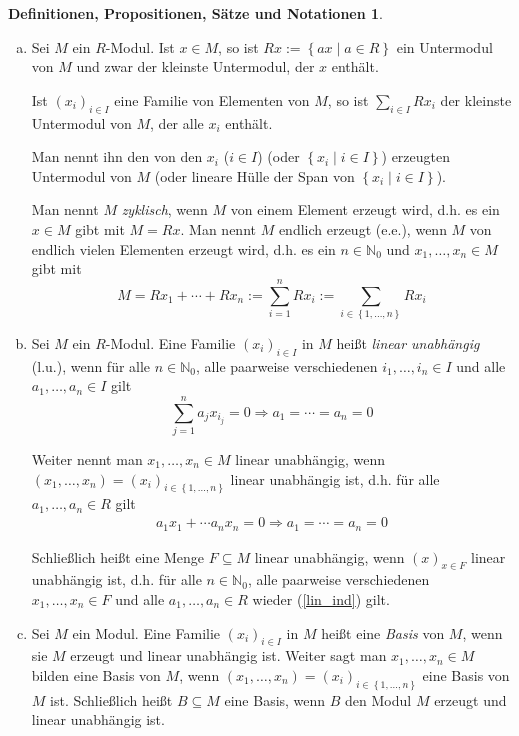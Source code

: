\documentclass[
twoside=semi,
fontsize=12,
DIV=12, 
cleardoublepage=current,
leqno,
headings=optiontoheadandtoc, 
toc=idx
]{scrbook}
\newcommand{\N}{\mathbb{N}}
\newcommand{\set}[1]{\left\{ #1 \right\}}
\theoremstyle{definition}
\newtheorem{def-prop-satz-not}[definition]{Definitionen, Propositionen, S\"atze und Notationen}
\begin{document}
\begin{def-prop-satz-not}
\begin{enumerate}[(a)]
			\item Sei $M$ ein $R$-Modul. Ist $x \in M$, so ist $Rx := \set{ax \mid a \in R}$ ein Untermodul von $M$ und zwar der kleinste Untermodul, der $x$ enth\"alt.
			
			Ist $(x_i)_{i \in I}$ eine Familie von Elementen von $M$, so ist $\sum_{i \in I} Rx_i$ der kleinste Untermodul von $M$, der alle $x_i$ enth\"alt.
			
			Man nennt ihn den von den $x_i$ ($i \in I$) (oder $\set{x_i \mid i \in I}$) erzeugten Untermodul von $M$ (oder lineare H\"ulle der Span von $\set{x_i \mid i \in I}$). 
			
			Man nennt $M$ \emph{zyklisch}, wenn $M$ von einem Element erzeugt wird, d.h. es ein $x \in M$ gibt mit $M = Rx$. Man nennt $M$ endlich erzeugt (e.e.), wenn $M$ von endlich vielen Elementen
			erzeugt wird, d.h. es ein $n \in \N_0$ und $x_1, \dots, x_n \in M$ gibt mit 
			\[M = Rx_1 + \cdots + Rx_n := \sum_{i=1}^{n} Rx_i := \sum_{i \in \set{1, \dots, n}} Rx_i\] 
			
			\item Sei $M$ ein $R$-Modul. Eine Familie $(x_i)_{i\in I}$ in $M$ hei\ss t \emph{linear unabh\"angig} (l.u.), wenn f\"ur alle $n\in \N_0$, alle paarweise verschiedenen $i_1, \dots, i_n \in I$ und alle $a_1, \dots, a_n \in I$ gilt 
			\[\sum_{j=1}^{n} a_jx_{i_j} = 0 \Rightarrow a_1 = \cdots = a_n = 0\]
			
			Weiter nennt man $x_1, \dots, x_n \in M$ linear unabh\"angig, wenn $(x_1, \dots, x_n) = (x_i)_{i \in \set{1, \dots, n}}$ linear unabh\"angig ist, d.h. f\"ur alle $a_1, \dots, a_n \in R$ gilt 
			\begin{align}
				a_1x_1 + \cdots a_nx_n = 0 \Rightarrow a_1 = \cdots = a_n = 0 \label{lin_ind}\tag{$*$}
			\end{align}
			
			Schlie\ss lich hei\ss t eine Menge $F\subseteq M$ linear unabh\"angig, wenn $(x)_{x \in F}$ linear unabh\"angig ist, d.h. f\"ur alle $n\in \N_0$, alle paarweise verschiedenen $x_1, \dots, x_n \in F$ und alle $a_1, \dots, a_n \in R$ wieder (\ref{lin_ind}) gilt.
			
			\item Sei $M$ ein Modul. Eine Familie $(x_i)_{i \in I}$ in $M$ hei\ss t eine \emph{Basis} von $M$, wenn sie $M$ erzeugt und linear unabh\"angig ist. Weiter
			sagt man $x_1, \dots, x_n \in M$ bilden eine Basis von $M$, wenn $(x_1, \dots, x_n) = (x_i)_{i \in \set{1, \dots, n}}$ eine Basis von $M$ ist. Schlie\ss lich hei\ss t $B \subseteq M$ eine Basis, wenn $B$ den Modul $M$ erzeugt und linear unabh\"angig ist.
			

\end{enumerate}
\end{def-prop-satz-not}
\end{document}

